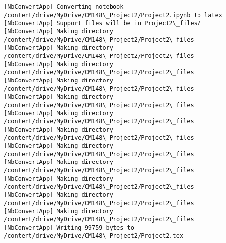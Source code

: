\documentclass[11pt]{article}
\makeatletter
\newcommand{\boxspacing}{\kern\kvtcb@left@rule\kern\kvtcb@boxsep}
\newcommand{\prompt}[4]{
        {\ttfamily\llap{{\color{#2}[#3]:\hspace{3pt}#4}}\vspace{-\baselineskip}}
    }
\makeatother
\begin{document}
    \begin{Verbatim}[commandchars=\\\{\}]
[NbConvertApp] Converting notebook
/content/drive/MyDrive/CM148\_Project2/Project2.ipynb to latex
[NbConvertApp] Support files will be in Project2\_files/
[NbConvertApp] Making directory
/content/drive/MyDrive/CM148\_Project2/Project2\_files
[NbConvertApp] Making directory
/content/drive/MyDrive/CM148\_Project2/Project2\_files
[NbConvertApp] Making directory
/content/drive/MyDrive/CM148\_Project2/Project2\_files
[NbConvertApp] Making directory
/content/drive/MyDrive/CM148\_Project2/Project2\_files
[NbConvertApp] Making directory
/content/drive/MyDrive/CM148\_Project2/Project2\_files
[NbConvertApp] Making directory
/content/drive/MyDrive/CM148\_Project2/Project2\_files
[NbConvertApp] Making directory
/content/drive/MyDrive/CM148\_Project2/Project2\_files
[NbConvertApp] Making directory
/content/drive/MyDrive/CM148\_Project2/Project2\_files
[NbConvertApp] Making directory
/content/drive/MyDrive/CM148\_Project2/Project2\_files
[NbConvertApp] Making directory
/content/drive/MyDrive/CM148\_Project2/Project2\_files
[NbConvertApp] Making directory
/content/drive/MyDrive/CM148\_Project2/Project2\_files
[NbConvertApp] Making directory
/content/drive/MyDrive/CM148\_Project2/Project2\_files
[NbConvertApp] Writing 99759 bytes to
/content/drive/MyDrive/CM148\_Project2/Project2.tex
    \end{Verbatim}

    \begin{tcolorbox}[breakable, size=fbox, boxrule=1pt, pad at break*=1mm,colback=cellbackground, colframe=cellborder]
\prompt{In}{incolor}{ }{\boxspacing}
\begin{Verbatim}[commandchars=\\\{\}]

\end{Verbatim}
\end{tcolorbox}


    
    
    
\end{document}
